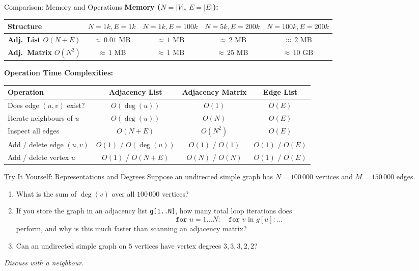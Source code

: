 \documentclass{beamer}
\begin{document}
\begin{frame}{Comparison: Memory and Operations}
  \textbf{Memory ($N = |V|$, $E = |E|$):}\par\vspace{0.1em}
  {\scriptsize\setlength{\tabcolsep}{1pt}
  \begin{tabular}{lcccc}
    \toprule
    \textbf{Structure} & $N{=}1k, E{=}1k$ & $N{=}1k, E{=}100k$ & $N{=}5k, E{=}200k$ & $N{=}100k, E{=}200k$ \\
    \midrule
    \textbf{Adj.\ List} $O(N{+}E)$ & ${\approx}\,0.01\text{ MB}$ & ${\approx}\,1\text{ MB}$ & ${\approx}\,2\text{ MB}$ & ${\approx}\,2\text{ MB}$ \\
    \textbf{Adj.\ Matrix} $O(N^2)$ & ${\approx}\,1\text{ MB}$ & ${\approx}\,1\text{ MB}$ & ${\approx}\,25\text{ MB}$ & \textcolor{kcpc-red}{\textbf{${\approx}\,10\text{ GB}$}} \\
    \bottomrule
  \end{tabular}}

  \vspace{0.3em}
  \textbf{Operation Time Complexities:}\par\vspace{0.1em}
  {\scriptsize\setlength{\tabcolsep}{1.5pt}
  \begin{tabular}{lccc}
    \toprule
    \textbf{Operation} & \textbf{Adjacency List} & \textbf{Adjacency Matrix} & \textbf{Edge List} \\
    \midrule
    Does edge $(u,v)$ exist? & $O(\deg(u))$ & $O(1)$ & $O(E)$ \\
    Iterate neighbours of $u$ & \textcolor{kcpc-green}{\textbf{$O(\deg(u))$}} & $O(N)$ & $O(E)$ \\
    Inspect all edges & \textcolor{kcpc-green}{\textbf{$O(N + E)$}} & $O(N^2)$ & $O(E)$ \\
    Add / delete edge $(u,v)$ & $O(1)$ / $O(\deg(u))$ & $O(1)$ / $O(1)$ & $O(1)$ / $O(E)$ \\
    Add / delete vertex $u$ & $O(1)$ / $O(N + E)$ & $O(N)$ / $O(N)$ & $O(1)$ / $O(E)$ \\
    \bottomrule
  \end{tabular}}
\end{frame}

\begin{frame}{Try It Yourself: Representations and Degrees}
  Suppose an undirected simple graph has $N = 100\,000$ vertices and $M = 150\,000$ edges.
  \begin{enumerate}
    \item What is the sum of $\deg(v)$ over all $100\,000$ vertices?
    \item If you store the graph in an adjacency list \texttt{g[1..N]}, how many total loop iterations does
      \[ \texttt{for } u = 1 \dots N: \quad \texttt{for } v \text{ in } g[u]: \dots \]
      perform, and why is this much faster than scanning an adjacency matrix?
    \item Can an undirected simple graph on $5$ vertices have vertex degrees $3, 3, 3, 2, 2$?
  \end{enumerate}
  \emph{Discuss with a neighbour.}
\end{frame}
\end{document}
